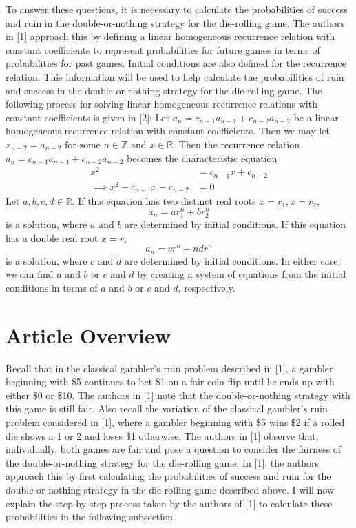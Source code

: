 \documentclass[12pt]{article}
\begin{document}
To answer these questions, it is necessary to calculate the probabilities of success and ruin in the double-or-nothing strategy for the die-rolling game.
The authors in [1] approach this by defining a linear homogeneous recurrence relation with constant coefficients to represent probabilities for future games in terms of probabilities for past games.
Initial conditions are also defined for the recurrence relation.
This information will be used to help calculate the probabilities of ruin and success in the double-or-nothing strategy for the die-rolling game.
The following process for solving linear homogeneous recurrence relations with constant coefficients is given in [2]:
\newline Let $a_n = c_{n-1}a_{n-1} + c_{n-2}a_{n-2}$ be a linear homogeneous recurrence relation with constant coefficients.  
Then we may let $x_{n-2} = a_{n-2} \text { for some } n \in \mathbb{Z} \text{ and } x \in \mathbb{R}$.
Then the recurrence relation $a_n = c_{n-1}a_{n-1} + c_{n-2}a_{n-2}$ becomes the characteristic equation
\begin{align}
    x^2 &= c_{n-1}x + c_{n-2} \\
\implies x^2 - c_{n-1}x - c_{n-2} &= 0
\end{align}
Let $a, b, c, d \in \mathbb{R}$.
If this equation has two distinct real roots $x = r_1, x = r_2$,  $$a_{n} = ar_{1}^{n} + br_{2}^{n}$$ is a solution, where $a\text{ and }b$ are determined by initial conditions.
\newline If this equation has a double real root $x = r$, $$a_{n} = cr^{n} + ndr^{n}$$ is a solution, where $c\text{ and }d$ are determined by initial conditions.
\newline In either case, we can find $a\text{ and }b$ or $c\text{ and }d$ by creating a system of equations from the initial conditions in terms of $a\text{ and }b$ or $c\text{ and }d$, respectively.

\section{Article Overview}
Recall that in the classical gambler's ruin problem described in [1], a gambler beginning with \$5 continues to bet \$1 on a fair coin-flip until he ends up with either \$0 or \$10.
The authors in [1] note that the double-or-nothing strategy with this game is still fair.
Also recall the variation of the classical gambler's ruin problem considered in [1], where a gambler beginning with \$5 wins \$2 if a rolled die shows a 1 or 2 and loses \$1 otherwise.
The authors in [1] observe that, individually, both games are fair and pose a question to consider the fairness of the double-or-nothing strategy for the die-rolling game.
In [1], the authors approach this by first calculating the probabilities of success and ruin for the double-or-nothing strategy in the die-rolling game described above.
I will now explain the step-by-step process taken by the authors of [1] to calculate these probabilities in the following subsection.
\end{document}
